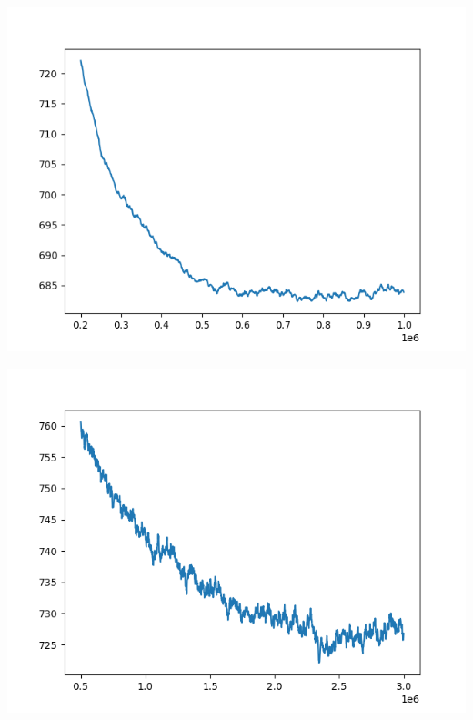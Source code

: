 \documentclass{article}
\begin{document}
\begin{enumerate}[label=\arabic*.]
\begin{minipage}{0.49\linewidth}
            \includegraphics[width=\linewidth]{../starter_code/figs/sgd_wo_k_50.png}
            \label{nobiasreg50}
        \end{minipage}\hfill
        \begin{minipage}{0.49\linewidth}
            \includegraphics[width=\linewidth]{../starter_code/figs/sgd_k50.png}
            \label{withbiasreg50}
        \end{minipage}\hfill
        \begin{minipage}{0.49\linewidth}

\end{minipage}
\end{enumerate}
\end{document}
